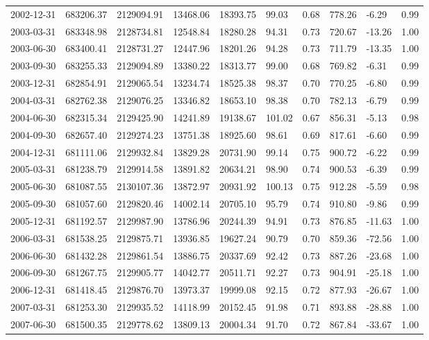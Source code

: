\begin{landscape}
\begin{longtable}{llllllllll}
2002-12-31 & 683206.37 & 2129094.91 & 13468.06 & 18393.75 & 99.03  & 0.68 & 778.26  & -6.29  & 0.99 \\
2003-03-31 & 683348.98 & 2128734.81 & 12548.84 & 18280.28 & 94.31  & 0.73 & 720.67  & -13.26 & 1.00 \\
2003-06-30 & 683400.41 & 2128731.27 & 12447.96 & 18201.26 & 94.28  & 0.73 & 711.79  & -13.35 & 1.00 \\
2003-09-30 & 683255.33 & 2129094.89 & 13380.22 & 18313.77 & 99.00  & 0.68 & 769.82  & -6.31  & 0.99 \\
2003-12-31 & 682854.91 & 2129065.54 & 13234.74 & 18525.38 & 98.37  & 0.70 & 770.25  & -6.80  & 0.99 \\
2004-03-31 & 682762.38 & 2129076.25 & 13346.82 & 18653.10 & 98.38  & 0.70 & 782.13  & -6.79  & 0.99 \\
2004-06-30 & 682315.34 & 2129425.90 & 14241.89 & 19138.67 & 101.02 & 0.67 & 856.31  & -5.13  & 0.98 \\
2004-09-30 & 682657.40 & 2129274.23 & 13751.38 & 18925.60 & 98.61  & 0.69 & 817.61  & -6.60  & 0.99 \\
2004-12-31 & 681111.06 & 2129932.84 & 13829.28 & 20731.90 & 99.14  & 0.75 & 900.72  & -6.22  & 0.99 \\
2005-03-31 & 681238.79 & 2129914.58 & 13891.82 & 20634.21 & 98.90  & 0.74 & 900.53  & -6.39  & 0.99 \\
2005-06-30 & 681087.55 & 2130107.36 & 13872.97 & 20931.92 & 100.13 & 0.75 & 912.28  & -5.59  & 0.98 \\
2005-09-30 & 681057.60 & 2129820.46 & 14002.14 & 20705.10 & 95.79  & 0.74 & 910.80  & -9.86  & 0.99 \\
2005-12-31 & 681192.57 & 2129987.90 & 13786.96 & 20244.39 & 94.91  & 0.73 & 876.85  & -11.63 & 1.00 \\
2006-03-31 & 681538.25 & 2129875.71 & 13936.85 & 19627.24 & 90.79  & 0.70 & 859.36  & -72.56 & 1.00 \\
2006-06-30 & 681432.28 & 2129861.54 & 13886.75 & 20337.69 & 92.42  & 0.73 & 887.26  & -23.68 & 1.00 \\
2006-09-30 & 681267.75 & 2129905.77 & 14042.77 & 20511.71 & 92.27  & 0.73 & 904.91  & -25.18 & 1.00 \\
2006-12-31 & 681418.45 & 2129876.70 & 13973.37 & 19999.08 & 92.15  & 0.72 & 877.93  & -26.67 & 1.00 \\
2007-03-31 & 681253.30 & 2129935.52 & 14118.99 & 20152.45 & 91.98  & 0.71 & 893.88  & -28.88 & 1.00 \\
2007-06-30 & 681500.35 & 2129778.62 & 13809.13 & 20004.34 & 91.70  & 0.72 & 867.84  & -33.67 & 1.00 \\

\end{longtable}
\end{landscape}
